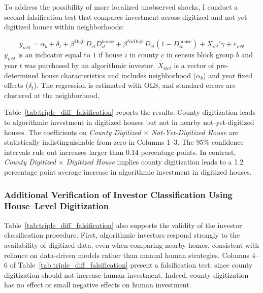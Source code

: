 \documentclass[11pt]{article}
\begin{document}
To address the possibility of more localized unobserved shocks, I conduct a second falsification test that compares investment across digitized and not-yet-digitized homes within neighborhoods:

\begin{equation} \label{eq:fs_triple_diff_falsification}
y_{icbt} 
= \alpha_b + \delta_t  
+ \beta^{\text{Digit}}  D_{ct}  D^{\text{house}}_{it}
+ \beta^{\text{NoDigit}} D_{ct} \left(1 - D^{\text{house}}_{it} \right)
+ X_{ibt}'\gamma + \varepsilon_{icbt}
\end{equation}
$y_{icbt}$ is an indicator equal to $1$ if house $i$ in county $c$ in census block group $b$ and year $t$ was purchased by an algorithmic investor. $X_{ibct}$ is a vector of pre-determined house characteristics and includes neighborhood ($\alpha_b$) and year fixed effects ($\delta_t$). The regression is estimated with OLS, and standard errors are clustered at the neighborhood. 

Table~\ref{tab:triple_diff_falsification} reports the results. County digitization leads to algorithmic investment in digitized houses but not in nearby not-yet-digitized houses.  The coefficients on \textit{County Digitized} $\times$ \textit{Not-Yet-Digitized House} are statistically indistinguishable from zero in Columns 1--3. The 95\% confidence intervals rule out increases larger than 0.14 percentage points. In contrast, \textit{County Digitized} $\times$ \textit{Digitized House} implies county digitization leads to a 1.2 percentage point average increase in algorithmic investment in digitized houses.

\subsubsection{Additional Verification of Investor Classification Using House--Level Digitization}\label{sec:additionalclassification}
Table~\ref{tab:triple_diff_falsification} also supports the validity of the investor classification procedure. First, algorithmic investors respond strongly to the availability of digitized data, even when comparing nearby homes, consistent with reliance on data-driven models rather than manual human strategies. Columns 4–6 of Table~\ref{tab:triple_diff_falsification} present a falsification test: since county digitization should not increase human investment. Indeed, county digitization has no effect or small negative effects on human investment.
\end{document}
